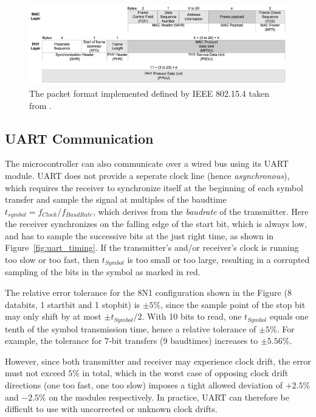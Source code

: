 \begin{figure}[t]
	\includegraphics[width=1\columnwidth]{figures/frame_format}
	\caption{The packet format implemented defined by \acs{IEEE} 802.15.4 taken from \cite{cc2420}.}
	\label{fig:packet_format}
\end{figure}

\subsection{\acs{UART} Communication}

The microcontroller can also communicate over a wired bus using its \ac{UART} module.
\ac{UART} does not provide a seperate clock line (hence \emph{asynchronous}), which requires the receiver to synchronize itself at the beginning of each symbol transfer and sample the signal at multiples of the baudtime $t_{symbol} = f_{Clock} / f_{BaudRate}$, which derives from the \emph{baudrate} of the transmitter.
Here the receiver synchronizes on the falling edge of the start bit, which is always low, and has to sample the successive bits at the just right time, as shown in Figure~\ref{fig:uart_timing}.
If the transmitter's and/or receiver's clock is running too slow or too fast, then $t_{Symbol}$ is too small or too large, resulting in a corrupted sampling of the bits in the symbol as marked in red.

The relative error tolerance for the 8N1 configuration shown in the Figure (8 databits, 1 startbit and 1 stopbit) is $\pm5\%$, since the sample point of the stop bit may only shift by at most $\pm t_{Symbol}/2$.
With 10 bits to read, one $t_{Symbol}$ equals one tenth of the symbol transmission time, hence a relative tolerance of $\pm5\%$.
For example, the tolerance for 7-bit transfers (9 baudtimes) increases to $\pm5.56\%$.

However, since both transmitter and receiver may experience clock drift, the error must not exceed $5\%$ in total, which in the worst case of opposing clock drift directions (one too fast, one too slow) imposes a tight allowed deviation of $+2.5\%$ and $-2.5\%$ on the modules respectively.
In practice, \ac{UART} can therefore be difficult to use with uncorrected or unknown clock drifts.

